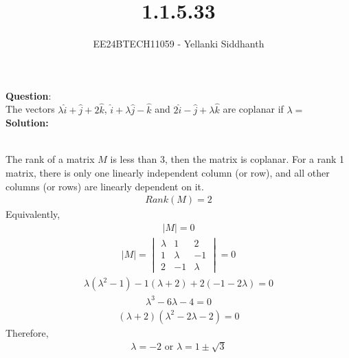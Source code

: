 \documentclass[journal]{IEEEtran}
\begin{document}

\vspace{3cm}

\title{1.1.5.33}
\author{EE24BTECH11059 - Yellanki Siddhanth
}
{\let\newpage\relax\maketitle}

\renewcommand{\thefigure}{\theenumi}
\renewcommand{\thetable}{\theenumi}
\setlength{\intextsep}{10pt} %


\renewcommand{\thetable}{\theenumi}


\textbf{Question}:\\

The vectors $\lambda\hat{i} + \hat{j} +2\hat{k}$, $\hat{i} + \lambda\hat{j} - \hat{k}$ and $2\hat{i} - \hat{j} +\lambda\hat{k}$  are coplanar if $\lambda = $
\\ \textbf{Solution: }\\
    \begin{table}[h!]    
      \centering
      
      \caption{}
    \end{table}\\
The rank of a matrix $M$ is less than 3, then the matrix is coplanar. For a rank 1 matrix, there is only one linearly independent column (or row), and all other columns (or rows) are linearly dependent on it.
    \begin{align}
        Rank(M) = 2\label{eq1.1.6.19.1}
    \end{align}
Equivalently,
    \begin{align}
        |M| = 0 \label{eq1.1.6.19.2}
    \end{align}
    \begin{align}
        |M| = \begin{vmatrix}\lambda & 1 & 2 \\ 1 & \lambda & -1 \\ 2 & -1 & \lambda\end{vmatrix}=0\label{eq1.1.6.19.3}
    \end{align}
    \begin{align}
        \lambda(\lambda^2 - 1) - 1(\lambda+2) + 2(-1-2\lambda) = 0  \label{eq1.1.6.19.4}
    \end{align}
    \begin{align}
        \lambda^3 - 6\lambda - 4 = 0  \label{eq1.1.6.19.5}
    \end{align}
    \begin{align}
        (\lambda + 2)(\lambda^2 - 2\lambda - 2) = 0  \label{eq1.1.6.19.6}
    \end{align}
Therefore,
    \begin{align}
         \lambda = -2 \text{ or } \lambda = 1 \pm \sqrt{3}\label{eq1.1.6.19.6}
    \end{align}
    
\end{document}
